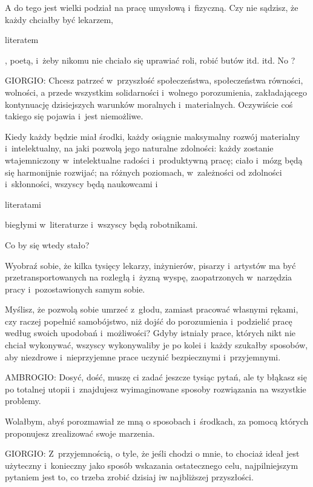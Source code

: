 \documentclass[oneside,polish,11pt,sfheadings]{mwbk}
\begin{document}
 
A do tego jest wielki podział na pracę umysłową i~fizyczną. Czy nie sądzisz, że każdy chciałby być lekarzem,
\begin{itshape}literatem \end{itshape}, poetą, i~żeby nikomu nie chciało się uprawiać roli,
robić butów itd. itd.  No ? 




 
\noindent GIORGIO: Chcesz patrzeć w~przyszłość społeczeństwa, społeczeństwa równości, wolności, a przede wszystkim solidarności i~wolnego porozumienia, zakładającego kontynuację dzisiejszych warunków moralnych i~materialnych. Oczywiście coś takiego
się pojawia i~jest niemożliwe. 

 
Kiedy każdy będzie miał środki, każdy osiągnie maksymalny rozwój materialny i~intelektualny, na jaki pozwolą jego
naturalne zdolności: każdy zostanie wtajemniczony w~intelektualne radości i~produktywną pracę; ciało i~mózg będą się
harmonijnie rozwijać; na różnych poziomach, w~zależności od zdolności i~skłonności, wszyscy będą naukowcami i~\begin{itshape}literatami \end{itshape} biegłymi w~literaturze i~wszyscy będą robotnikami. 

 
Co by się wtedy stało? 

 
Wyobraź sobie, że kilka tysięcy lekarzy, inżynierów, pisarzy i~artystów ma być przetransportowanych na rozległą i~żyzną
wyspę, zaopatrzonych w~narzędzia pracy i~pozostawionych samym sobie. 

 
Myślisz, że pozwolą sobie umrzeć z~głodu, zamiast pracować własnymi rękami, czy raczej popełnić samobójstwo, niż dojść
do porozumienia i~podzielić pracę według swoich upodobań i~możliwości? Gdyby istniały prace, których nikt nie chciał
wykonywać, wszyscy wykonywaliby je po kolei i~każdy szukałby sposobów, aby niezdrowe i~nieprzyjemne prace uczynić
bezpiecznymi i~przyjemnymi. 




 
\noindent AMBROGIO: Dosyć, dość, muszę ci zadać jeszcze tysiąc pytań, ale ty błąkasz się po totalnej utopii i~znajdujesz
wyimaginowane sposoby rozwiązania na wszystkie problemy. 

 
Wolałbym, abyś porozmawiał ze mną o sposobach i~środkach, za pomocą których proponujesz zrealizować swoje marzenia. 




 
\noindent GIORGIO: Z~przyjemnością, o tyle, że jeśli chodzi o mnie, to chociaż ideał jest użyteczny i~konieczny jako sposób
wskazania ostatecznego celu, najpilniejszym pytaniem jest to, co trzeba zrobić dzisiaj iw najbliższej przyszłości. 
\end{document}
